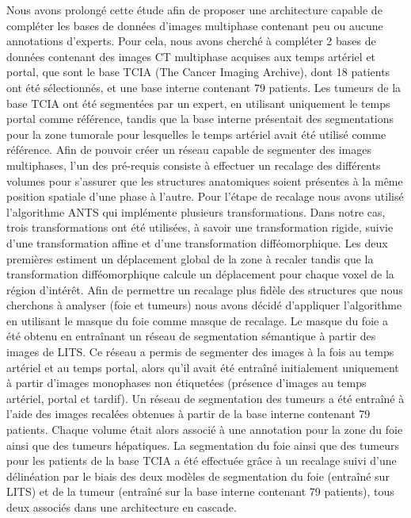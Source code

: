 \documentclass[]{memoir}
\begin{document}
Nous avons prolongé cette étude afin de proposer une architecture capable de compléter les bases de données d’images multiphase contenant peu ou aucune annotations d’experts. Pour cela, nous avons cherché à compléter 2 bases de données contenant des images CT multiphase acquises aux temps artériel et portal, que sont le base TCIA (The Cancer Imaging Archive), dont 18 patients ont été sélectionnés, et une base interne contenant 79 patients.
Les tumeurs de la base TCIA ont été segmentées par un expert, en utilisant uniquement le temps portal comme référence, tandis que la base interne présentait des segmentations pour la zone tumorale pour lesquelles le temps artériel avait été utilisé comme référence.
Afin de pouvoir créer un réseau capable de segmenter des images multiphases, l’un des pré-requis consiste à effectuer un recalage des différents volumes pour s’assurer que les structures anatomiques soient présentes à la même position spatiale d’une phase à l’autre.
Pour l’étape de recalage nous avons utilisé l’algorithme ANTS qui implémente plusieurs transformations. Dans notre cas, trois transformations ont été utilisées, à savoir une transformation rigide, suivie d’une transformation affine et d’une transformation difféomorphique. Les deux premières estiment un déplacement global de la zone à recaler tandis que la transformation difféomorphique calcule un déplacement pour chaque voxel de la région d’intérêt. Afin de permettre un recalage plus fidèle des structures que nous cherchons à analyser (foie et tumeurs) nous avons décidé d’appliquer l’algorithme en utilisant le masque du foie comme masque de recalage. Le masque du foie a été obtenu en entraînant un réseau de segmentation sémantique à partir des images de LITS. Ce réseau a permis de segmenter des images à la fois au temps artériel et au temps portal, alors qu’il avait été entraîné initialement uniquement à partir d’images monophases non étiquetées (présence d’images au temps artériel, portal et tardif).
Un réseau de segmentation des tumeurs a été entraîné à l’aide des images recalées obtenues à partir de la base interne contenant 79 patients. Chaque volume était alors associé à une annotation pour la zone du foie ainsi que des tumeurs hépatiques.
La segmentation du foie ainsi que des tumeurs pour les patients de la base TCIA a été effectuée grâce à un recalage suivi d’une délinéation par le biais des deux modèles de segmentation du foie (entraîné sur LITS) et de la tumeur (entraîné sur la base interne contenant 79 patients), tous deux associés dans une architecture en cascade.
\end{document}
